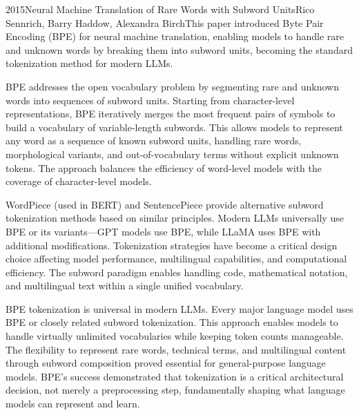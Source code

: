 
\begin{papersummary}{2015}{Neural Machine Translation of Rare Words with Subword Units}{Rico Sennrich, Barry Haddow, Alexandra Birch}{This paper introduced Byte Pair Encoding (BPE) for neural machine translation, enabling models to handle rare and unknown words by breaking them into subword units, becoming the standard tokenization method for modern LLMs.}

BPE addresses the open vocabulary problem by segmenting rare and unknown words into sequences of subword units. Starting from character-level representations, BPE iteratively merges the most frequent pairs of symbols to build a vocabulary of variable-length subwords. This allows models to represent any word as a sequence of known subword units, handling rare words, morphological variants, and out-of-vocabulary terms without explicit unknown tokens. The approach balances the efficiency of word-level models with the coverage of character-level models.

WordPiece (used in BERT) and SentencePiece provide alternative subword tokenization methods based on similar principles. Modern LLMs universally use BPE or its variants—GPT models use BPE, while LLaMA uses BPE with additional modifications. Tokenization strategies have become a critical design choice affecting model performance, multilingual capabilities, and computational efficiency. The subword paradigm enables handling code, mathematical notation, and multilingual text within a single unified vocabulary.

BPE tokenization is universal in modern LLMs. Every major language model uses BPE or closely related subword tokenization. This approach enables models to handle virtually unlimited vocabularies while keeping token counts manageable. The flexibility to represent rare words, technical terms, and multilingual content through subword composition proved essential for general-purpose language models. BPE's success demonstrated that tokenization is a critical architectural decision, not merely a preprocessing step, fundamentally shaping what language models can represent and learn.

\end{papersummary}
